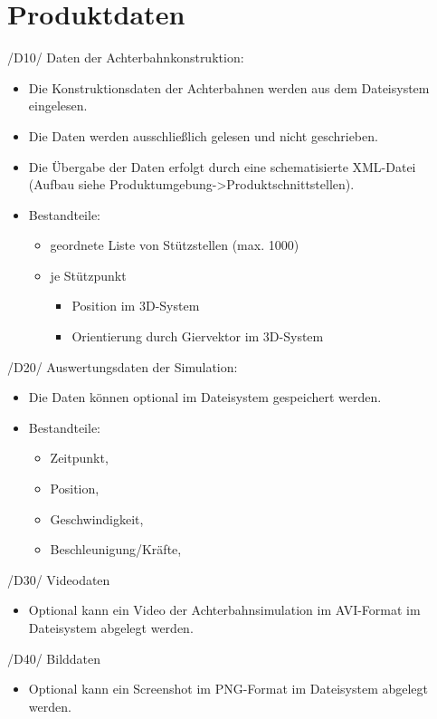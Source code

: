 
\chapter{Produktdaten}

/D10/ Daten der Achterbahnkonstruktion:
\begin{itemize}
\item Die Konstruktionsdaten der Achterbahnen werden aus dem Dateisystem eingelesen.
\item Die Daten werden ausschließlich gelesen und nicht geschrieben.
\item Die Übergabe der Daten erfolgt durch eine schematisierte XML-Datei \\(Aufbau siehe Produktumgebung->Produktschnittstellen).
\item Bestandteile:
	\begin{itemize}
	\item geordnete Liste von Stützstellen (max. 1000)
	\item je Stützpunkt
		\begin{itemize}
		\item Position im 3D-System
		\item Orientierung durch Giervektor im 3D-System
		\end{itemize}
	\end{itemize}
\end{itemize}

/D20/ Auswertungsdaten der Simulation:
\begin{itemize}
\item Die Daten können optional im Dateisystem gespeichert werden.
\item Bestandteile:
\begin{itemize}
\item Zeitpunkt,
\item Position,
\item Geschwindigkeit,
\item Beschleunigung/Kräfte,
\end{itemize}
\end{itemize}

/D30/ Videodaten
\begin{itemize}
\item  Optional kann ein Video der Achterbahnsimulation im AVI-Format im Dateisystem abgelegt werden.
\end{itemize}

/D40/ Bilddaten
\begin{itemize}
\item  Optional kann ein Screenshot im PNG-Format im Dateisystem abgelegt werden.
\end{itemize}
